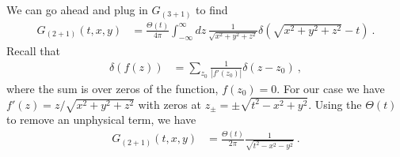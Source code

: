 \documentclass[
  11pt,
	colorful,
	raggedright,
]{tufte-style-thesis-flip}
\begin{document}
We can go ahead and plug in $G_{(3+1)}$ to find
\begin{align}
  G_{(2+1)}(t,x,y) 
  &= \frac{\Theta(t)}{4\pi}\int_{-\infty}^{\infty}dz\,
  \frac{1}{\sqrt{x^2+y^2 + z^2}}
  \delta(\sqrt{x^2+y^2+z^2}-t) \ .
\end{align}
Recall that
\begin{align}
  \delta(f(z)) &= \sum_{z_0} \frac{1}{|f'(z_0)|} \delta(z-z_0) \ ,
\end{align}
where the sum is over zeros of the function, $f(z_0)=0$. For our case we have $f'(z) = z/\sqrt{x^2+y^2+z^2}$ with zeros at $z_\pm = \pm \sqrt{t^2 - x^2+y^2}$. Using the $\Theta(t)$ to remove an unphysical term, we have
\begin{align}
  G_{(2+1)}(t,x,y) &= \frac{\Theta(t)}{2\pi} \frac{1}{\sqrt{t^2-x^2-y^2}} \ .
\end{align}
\end{document}
